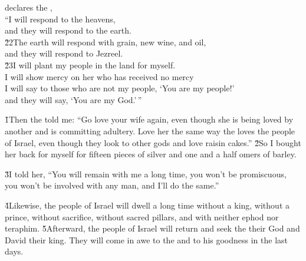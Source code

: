\begin{poetry}
\poemll    declares the , \\
\poeml ``I will respond to the heavens, \\
\poemll    and they will respond to the earth. \\
\poeml \v{22}The earth will respond with grain, new wine, and oil, \\
\poemll    and they will respond to Jezreel. \\
\poeml \v{23}I will plant my people in the land for myself. \\
\poemll    I will show mercy on her who has received no mercy \\
\poeml I will say to those who are not my people, `You are my people!' \\
\poemll    and they will say, `You are my God.'\,''
\end{poetry}

\v{1}Then the  told me: ``Go love your wife again, even though she is being loved by another and is committing adultery. Love her the same way the  loves the people of Israel, even though they look to other gods and love raisin cakes.'' \v{2}So I bought her back for myself for fifteen pieces of silver and one and a half omers of barley.

\v{3}I told her, ``You will remain with me a long time, you won't be promiscuous, you won't be involved with any man, and I'll do the same.''

\v{4}Likewise, the people of Israel will dwell a long time without a king, without a prince, without sacrifice, without sacred pillars, and with neither ephod nor teraphim. \v{5}Afterward, the people of Israel will return and seek the  their God and David their king. They will come in awe to the  and to his goodness in the last days.

